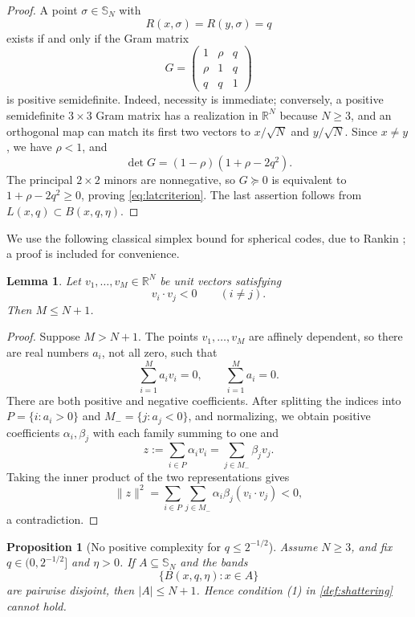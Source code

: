 \documentclass[11pt,reqno]{amsart}
\numberwithin{equation}{section}
\theoremstyle{plain}
\newtheorem{proposition}[proposition]{Proposition}
\newtheorem{lemma}[lemma]{Lemma}
\theoremstyle{definition}
\theoremstyle{remark}
\newcommand{\SN}{\mathbb{S}_N}
\newcommand{\R}{\mathbb R}
\newcommand{\1}{\mathbf 1}
\begin{document}
\begin{proof}
A point \(\sigma\in\SN\) with
\[
 R(x,\sigma)=R(y,\sigma)=q
\]
exists if and only if the Gram matrix
\[
 G=\begin{pmatrix}
 1&\rho&q\\
 \rho&1&q\\
 q&q&1
 \end{pmatrix}
\]
is positive semidefinite.  Indeed, necessity is immediate; conversely, a
positive semidefinite \(3\times3\) Gram matrix has a realization in
\(\R^N\) because \(N\geq3\), and an orthogonal map can match its first two
vectors to \(x/\sqrt N\) and \(y/\sqrt N\).  Since \(x\neq y\), we have
\(\rho<1\), and
\[
 \det G=(1-\rho)(1+\rho-2q^2).
\]
The principal \(2\times2\) minors are nonnegative, so \(G\succeq0\) is
equivalent to \(1+\rho-2q^2\geq0\), proving \eqref{eq:latcriterion}.  The
last assertion follows from \(L(x,q)\subset B(x,q,\eta)\).
\end{proof}

We use the following classical simplex bound for spherical codes, due
to Rankin \cite[Theorem~1]{Rankin1955}; a proof is included for
convenience.

\begin{lemma}\label{lem:obtuse}
Let \(v_1,\dots,v_M\in\R^N\) be unit vectors satisfying
\[
 v_i\cdot v_j<0\qquad(i\neq j).
\]
Then \(M\leq N+1\).
\end{lemma}

\begin{proof}
Suppose \(M>N+1\).  The points \(v_1,\dots,v_M\) are affinely dependent, so there are real numbers \(a_i\), not all zero, such that
\[
 \sum_{i=1}^M a_i v_i=0,
 \qquad
 \sum_{i=1}^M a_i=0.
\]
There are both positive and negative coefficients.  After splitting the indices into \(P=\{i:a_i>0\}\) and \(M_-=\{j:a_j<0\}\), and normalizing, we obtain positive coefficients \(\alpha_i,\beta_j\) with each family summing to one and
\[
 z:=\sum_{i\in P}\alpha_i v_i
 =\sum_{j\in M_-}\beta_j v_j.
\]
Taking the inner product of the two representations gives
\[
 \lVert z\rVert^2
 =\sum_{i\in P}\sum_{j\in M_-}\alpha_i\beta_j(v_i\cdot v_j)<0,
\]
a contradiction.
\end{proof}

\begin{proposition}[No positive complexity for \(q\leq2^{-1/2}\)]\label{prop:smallq}
Assume \(N\geq3\), and fix \(q\in(0,2^{-1/2}]\) and \(\eta>0\).  If
\(A\subseteq\SN\) and the bands
\[
 \{B(x,q,\eta):x\in A\}
\]
are pairwise disjoint, then \(\lvert A\rvert\leq N+1\).  Hence condition
\textup{(1)} in \cref{def:shattering} cannot hold.
\end{proposition}
\end{document}
